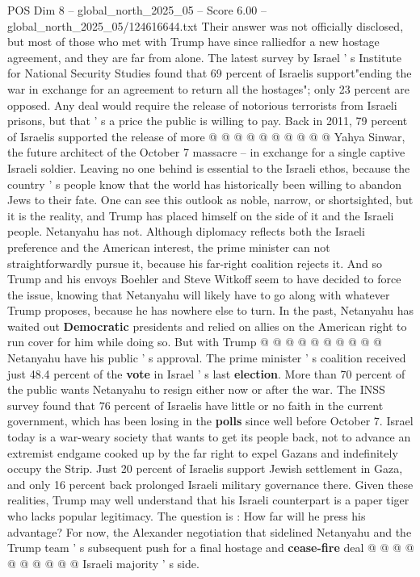 \begin{textsample}{POS Dim 8 – global\_north\_2025\_05 – Score 6.00 – global\_north\_2025\_05/124616644.txt}
Their answer was not officially disclosed, but most of those who met with Trump have since ralliedfor a new hostage agreement, and they are far from alone.
The latest survey by Israel ' s Institute for National Security Studies found that 69 percent of Israelis support"ending the war in exchange for an agreement to return all the hostages"; only 23 percent are opposed.
Any deal would require the release of notorious terrorists from Israeli prisons, but that ' s a price the public is willing to pay.
Back in 2011, 79 percent of Israelis supported the release of more @ @ @ @ @ @ @ @ @ @ Yahya Sinwar, the future architect of the October 7 massacre -- in exchange for a single captive Israeli soldier.
Leaving no one behind is essential to the Israeli ethos, because the country ' s people know that the world has historically been willing to abandon Jews to their fate.
One can see this outlook as noble, narrow, or shortsighted, but it is the reality, and Trump has placed himself on the side of it and the Israeli people.
Netanyahu has not.
Although diplomacy reflects both the Israeli preference and the American interest, the prime minister can not straightforwardly pursue it, because his far-right coalition rejects it.
And so Trump and his envoys Boehler and Steve Witkoff seem to have decided to force the issue, knowing that Netanyahu will likely have to go along with whatever Trump proposes, because he has nowhere else to turn.
In the past, Netanyahu has waited out \textbf{Democratic} presidents and relied on allies on the American right to run cover for him while doing so.
But with Trump @ @ @ @ @ @ @ @ @ @ Netanyahu have his public ' s approval.
The prime minister ' s coalition received just 48.4 percent of the \textbf{vote} in Israel ' s last \textbf{election}.
More than 70 percent of the public wants Netanyahu to resign either now or after the war.
The INSS survey found that 76 percent of Israelis have little or no faith in the current government, which has been losing in the \textbf{polls} since well before October 7.
Israel today is a war-weary society that wants to get its people back, not to advance an extremist endgame cooked up by the far right to expel Gazans and indefinitely occupy the Strip.
Just 20 percent of Israelis support Jewish settlement in Gaza, and only 16 percent back prolonged Israeli military governance there.
Given these realities, Trump may well understand that his Israeli counterpart is a paper tiger who lacks popular legitimacy.
The question is : How far will he press his advantage?
For now, the Alexander negotiation that sidelined Netanyahu and the Trump team ' s subsequent push for a final hostage and \textbf{cease-fire} deal @ @ @ @ @ @ @ @ @ @ Israeli majority ' s side.

\end{textsample}
